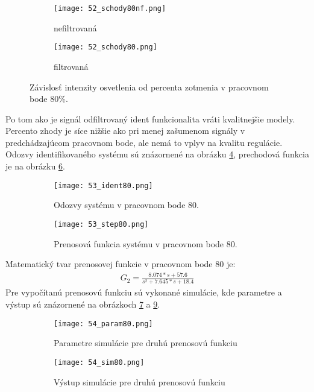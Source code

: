 \begin{figure}[!htbp]
\centering
\begin{subfigure}{0.5\linewidth}
\texttt{[image: 52\_schody80nf.png]}
\caption{nefiltrovaná}
\label{52_schodynf80}
\end{subfigure}%
\begin{subfigure}{0.5\linewidth}
\texttt{[image: 52\_schody80.png]}
\caption{filtrovaná}
\label{52_schody80}
\end{subfigure}
\caption{Závislosť intenzity osvetlenia od percenta zotmenia v pracovnom bode 80\%. }
\end{figure} 
 
Po tom ako je signál odfiltrovaný ident funkcionalita vráti kvalitnejšie modely. Percento zhody je síce nižšie ako pri menej zašumenom signály v predchádzajúcom pracovnom bode, ale nemá to vplyv na kvalitu regulácie. Odozvy identifikovaného systému sú znázornené na obrázku \ref{53_ident80}, prechodová funkcia je na obrázku \ref{53_step80}.
\begin{figure}[!htbp]
\centering
\begin{subfigure}{0.5\linewidth}
\texttt{[image: 53\_ident80.png]}
\caption{Odozvy systému v pracovnom bode 80.}
\label{53_ident80}
\end{subfigure}%
\begin{subfigure}{0.5\linewidth}
\texttt{[image: 53\_step80.png]}
\caption{Prenosová funkcia systému v pracovnom bode 80.}
\label{53_step80}
\end{subfigure}
\caption{}
\end{figure}  
Matematický tvar prenosovej funkcie v pracovnom bode 80 je:
\begin{equation} \label{eq41}
\begin{split}
 G_2 = \frac{8.074*s + 57.6}{s^2 + 7.645*s + 18.4}
\end{split}
\end{equation}
Pre vypočítanú prenosovú funkciu sú vykonané simulácie, kde parametre a výstup sú znázornené na obrázkoch \ref{54_param80} a \ref{54_sim80}.
\begin{figure}[!htbp]
\centering
\begin{subfigure}{0.5\linewidth}
\texttt{[image: 54\_param80.png]}
\caption{Parametre simulácie pre druhú prenosovú funkciu}
\label{54_param80}
\end{subfigure}%
\begin{subfigure}{0.5\linewidth}
\texttt{[image: 54\_sim80.png]}
\caption{Výstup simulácie pre druhú prenosovú funkciu}
\label{54_sim80}
\end{subfigure}
\caption{}
\end{figure}
